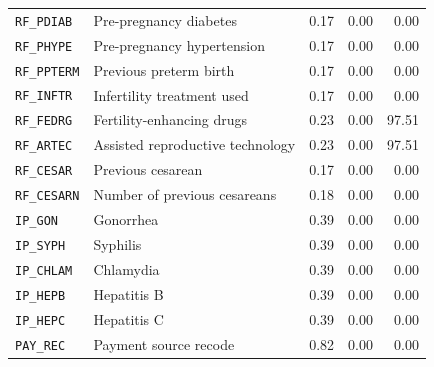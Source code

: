 \documentclass[journal]{IEEEtran}
\begin{document}
\begin{table}[!t]
\begin{tabular}{llrrr}
\texttt{RF\_PDIAB} & Pre-pregnancy diabetes & 0.17 & 0.00 & 0.00 \\
\texttt{RF\_PHYPE} & Pre-pregnancy hypertension & 0.17 & 0.00 & 0.00 \\
\texttt{RF\_PPTERM} & Previous preterm birth & 0.17 & 0.00 & 0.00 \\
\texttt{RF\_INFTR} & Infertility treatment used & 0.17 & 0.00 & 0.00 \\
\texttt{RF\_FEDRG} & Fertility-enhancing drugs & 0.23 & 0.00 & 97.51 \\
\texttt{RF\_ARTEC} & Assisted reproductive technology & 0.23 & 0.00 & 97.51 \\
\texttt{RF\_CESAR} & Previous cesarean & 0.17 & 0.00 & 0.00 \\
\texttt{RF\_CESARN} & Number of previous cesareans & 0.18 & 0.00 & 0.00 \\
\texttt{IP\_GON} & Gonorrhea & 0.39 & 0.00 & 0.00 \\
\texttt{IP\_SYPH} & Syphilis & 0.39 & 0.00 & 0.00 \\
\texttt{IP\_CHLAM} & Chlamydia & 0.39 & 0.00 & 0.00 \\
\texttt{IP\_HEPB} & Hepatitis B & 0.39 & 0.00 & 0.00 \\
\texttt{IP\_HEPC} & Hepatitis C & 0.39 & 0.00 & 0.00 \\
\texttt{PAY\_REC} & Payment source recode & 0.82 & 0.00 & 0.00 \\
\bottomrule
\end{tabular}
\end{table}
\end{document}
